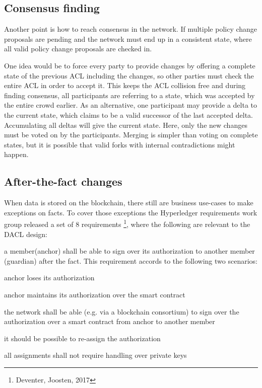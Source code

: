 \documentclass[12pt, conference]{IEEEtran}
\begin{document}
\subsection{Consensus finding}
Another point is how to reach consensus in the network. If multiple policy change proposals are pending and the network must end up in a consistent state, where all valid policy change proposals are checked in. 

One idea would be to force every party to provide changes by offering a complete state of the previous ACL including the changes, so other parties must check the entire ACL in order to accept it. This keeps the ACL collision free and during finding consensus, all participants are referring to a state, which was accepted by the entire crowd earlier. As an alternative, one participant may provide a delta to the current state, which claims to be a valid successor of the last accepted delta. Accumulating all deltas will give the current state. Here, only the new changes must be voted on by the participants. Merging is simpler than voting on complete states, but it is possible that valid forks with internal contradictions might happen.

\subsection{After-the-fact changes}
When data is stored on the blockchain, there still are business use-cases to make exceptions on facts. To cover those exceptions the Hyperledger requirements work group released a set of 8 requirements \footnote{Deventer, Joosten, 2017}, where the following are relevant to the DACL design:

\begin{itemize}
\item{a member(anchor) shall be able to sign over its authorization to another member (guardian) after the fact. This requirement accords to the following two scenarios:

\item{anchor loses its authorization}
\item{anchor maintains its authorization over the smart contract}
}
\item the network shall be able (e.g. via a blockchain consortium) to sign over the authorization over a smart contract from anchor to another member
\item it should be possible to re-assign the authorization
\item all assignments shall not require handling over private keys
\end{itemize}
\end{document}
